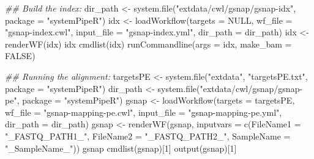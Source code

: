 \documentclass[14pt,]{article}
\newcommand{\hlnum}[1]{\textcolor[rgb]{0.816,0.125,0.439}{#1}}%
\newcommand{\hlstr}[1]{\textcolor[rgb]{0.251,0.627,0.251}{#1}}%
\newcommand{\hlcom}[1]{\textcolor[rgb]{0.502,0.502,0.502}{\textit{#1}}}%
\newcommand{\hlstd}[1]{\textcolor[rgb]{0.251,0.251,0.251}{#1}}%
\newenvironment{Shaded}{\begin{myshaded}}{\end{myshaded}}
\newcommand{\DecValTok}[1]{\hlnum{#1}}
\newcommand{\ConstantTok}[1]{\hlnum{#1}}
\newcommand{\StringTok}[1]{\hlstr{#1}}
\newcommand{\DocumentationTok}[1]{\hlcom{#1}}
\newcommand{\OtherTok}[1]{{#1}}
\newcommand{\FunctionTok}[1]{\hlstd{#1}}
\newcommand{\AttributeTok}[1]{{#1}}
\newcommand{\NormalTok}[1]{\hlstd{#1}}
\begin{document}
\begin{Shaded}
\begin{Highlighting}[]
\DocumentationTok{\#\# Build the index:}
\NormalTok{dir\_path }\OtherTok{\textless{}{-}} \FunctionTok{system.file}\NormalTok{(}\StringTok{"extdata/cwl/gsnap/gsnap{-}idx"}\NormalTok{, }\AttributeTok{package =} \StringTok{"systemPipeR"}\NormalTok{)}
\NormalTok{idx }\OtherTok{\textless{}{-}} \FunctionTok{loadWorkflow}\NormalTok{(}\AttributeTok{targets =} \ConstantTok{NULL}\NormalTok{, }\AttributeTok{wf\_file =} \StringTok{"gsnap{-}index.cwl"}\NormalTok{, }\AttributeTok{input\_file =} \StringTok{"gsnap{-}index.yml"}\NormalTok{, }
    \AttributeTok{dir\_path =}\NormalTok{ dir\_path)}
\NormalTok{idx }\OtherTok{\textless{}{-}} \FunctionTok{renderWF}\NormalTok{(idx)}
\NormalTok{idx}
\FunctionTok{cmdlist}\NormalTok{(idx)}
\FunctionTok{runCommandline}\NormalTok{(}\AttributeTok{args =}\NormalTok{ idx, }\AttributeTok{make\_bam =} \ConstantTok{FALSE}\NormalTok{)}

\DocumentationTok{\#\# Running the alignment:}
\NormalTok{targetsPE }\OtherTok{\textless{}{-}} \FunctionTok{system.file}\NormalTok{(}\StringTok{"extdata"}\NormalTok{, }\StringTok{"targetsPE.txt"}\NormalTok{, }\AttributeTok{package =} \StringTok{"systemPipeR"}\NormalTok{)}
\NormalTok{dir\_path }\OtherTok{\textless{}{-}} \FunctionTok{system.file}\NormalTok{(}\StringTok{"extdata/cwl/gsnap/gsnap{-}pe"}\NormalTok{, }\AttributeTok{package =} \StringTok{"systemPipeR"}\NormalTok{)}
\NormalTok{gsnap }\OtherTok{\textless{}{-}} \FunctionTok{loadWorkflow}\NormalTok{(}\AttributeTok{targets =}\NormalTok{ targetsPE, }\AttributeTok{wf\_file =} \StringTok{"gsnap{-}mapping{-}pe.cwl"}\NormalTok{, }\AttributeTok{input\_file =} \StringTok{"gsnap{-}mapping{-}pe.yml"}\NormalTok{, }
    \AttributeTok{dir\_path =}\NormalTok{ dir\_path)}
\NormalTok{gsnap }\OtherTok{\textless{}{-}} \FunctionTok{renderWF}\NormalTok{(gsnap, }\AttributeTok{inputvars =} \FunctionTok{c}\NormalTok{(}\AttributeTok{FileName1 =} \StringTok{"\_FASTQ\_PATH1\_"}\NormalTok{, }\AttributeTok{FileName2 =} \StringTok{"\_FASTQ\_PATH2\_"}\NormalTok{, }
    \AttributeTok{SampleName =} \StringTok{"\_SampleName\_"}\NormalTok{))}
\NormalTok{gsnap}
\FunctionTok{cmdlist}\NormalTok{(gsnap)[}\DecValTok{1}\NormalTok{]}
\FunctionTok{output}\NormalTok{(gsnap)[}\DecValTok{1}\NormalTok{]}


\end{Highlighting}
\end{Shaded}
\end{document}
